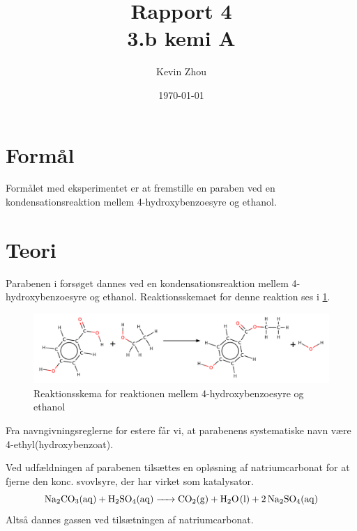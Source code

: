 \documentclass{report}
\title{Rapport 4\\
{\Large \textbf{3.b kemi A}}}
\author{Kevin Zhou}
\date{\today}
\begin{document}
\maketitle
\section*{Formål}
Formålet med eksperimentet er at fremstille en paraben ved en kondensationsreaktion mellem 4-hydroxybenzoesyre og ethanol.

\section*{Teori}
Parabenen i forsøget dannes ved en kondensationsreaktion mellem 4-hydroxybenzoesyre og ethanol. 
Reaktionsskemaet for denne reaktion ses i \cref{fig:kondensation}.
\begin{figure}[H]
\begin{center}
  \includegraphics[width=\textwidth]{kondensation.png}
\end{center}
\caption{Reaktionsskema for reaktionen mellem 4-hydroxybenzoesyre og ethanol}
\label{fig:kondensation}
\end{figure}
\noindent Fra navngivningsreglerne for estere får vi, at parabenens systematiske navn være 4-ethyl(hydroxybenzoat).

Ved udfældningen af parabenen tilsættes en opløsning af natriumcarbonat for at fjerne den konc. svovlsyre, der har virket som katalysator.
\[
\ce{Na2CO3(aq) + H2SO4(aq) -> CO2(g) + H2O(l) + 2Na2SO4(aq)} 
\] 
Altså dannes gassen  ved tilsætningen af natriumcarbonat.
\end{document}
